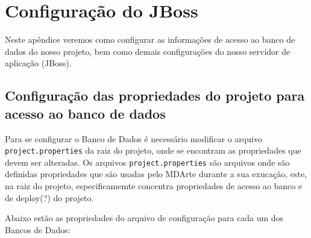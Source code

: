\appendix
\chapter{Configuração do JBoss}
\label{jboss-config}
Neste apêndice veremos como configurar as informações de acesso ao banco de
dados do nosso projeto, bem como demais configurações do nosso servidor de
aplicação (JBoss).

\section{Configuração das propriedades do projeto para acesso ao banco de dados}
Para se configurar o Banco de Dados é necessário modificar o arquivo
\texttt{project.properties} da raiz do projeto, onde se encontram as
propriedades que devem ser alteradas. Os arquivos
\texttt{project.properties} são arquivos onde são definidas propriedades que são
usadas pelo MDArte durante a sua exucação, este, na raiz do projeto,
especificamemte concentra propriedades de acesso ao banco e de deploy(?) do
projeto.

Abaixo estão as propriedades do arquivo de
configuração para cada um dos Bancos de Dados:

